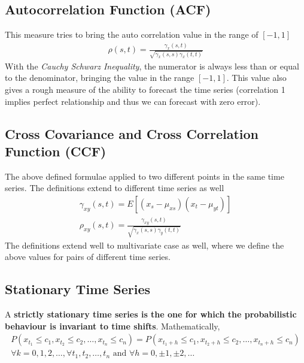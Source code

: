 \documentclass[../time_series_notes.tex]{subfiles}
\begin{document}
    \subsection{Autocorrelation Function (ACF)}
    This measure tries to bring the auto correlation value in the range of $[-1,1]$
    \begin{align*}
        \rho(s,t) = \frac{\gamma_{x}(s,t)}{\sqrt{\gamma_{x}(s,s) \gamma_{x}(t,t)}}
    \end{align*}
    With the \emph{Cauchy Schwarz Inequality}, the numerator is always less than or equal to the denominator, bringing the value in the range $[-1,1]$. This value also gives a rough measure of the ability to forecast the time series (correlation 1 implies perfect relationship and thus we can forecast with zero error).

    \subsection{Cross Covariance and Cross Correlation Function (CCF)}
    The above defined formulae applied to two different points in the same time series. The definitions extend to different time series as well
    \begin{align*}
        \gamma_{xy}(s,t) = E[(x_{s} - \mu_{xs})(x_{t} - \mu_{yt})]\\
        \rho_{xy}(s,t) = \frac{\gamma_{xy}(s,t)}{\sqrt{\gamma_{x}(s,s) \gamma_{y}(t,t)}}
    \end{align*}
    The definitions extend well to multivariate case as well, where we define the above values for pairs of different time series.

    
    \subsection{Stationary Time Series}
    A \textbf{strictly stationary time series is the one for which the probabilistic behaviour is invariant to time shifts}. Mathematically,
    \begin{gather*}
        P(x_{t_{1}} \leq c_{1}, x_{t_{2}} \leq c_{2}, \ldots, x_{t_{n}} \leq c_{n}) = P(x_{t_{1}+h} \leq c_{1}, x_{t_{2}+h} \leq c_{2}, \ldots, x_{t_{n}+h} \leq c_{n})\\
    \forall k = 0,1,2,\ldots, \forall t_{1}, t_{2}, \ldots, t_{n} \text{ and } \forall h = 0, \pm 1, \pm 2, \ldots
    \end{gather*}
\end{document}
